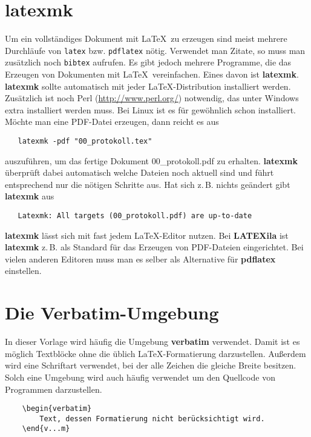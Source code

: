 \section{latexmk}

Um ein vollständiges Dokument mit \LaTeX\ zu erzeugen sind meist mehrere Durchläufe von \verb|latex| bzw. \verb|pdflatex| nötig. Verwendet man Zitate, so muss man zusätzlich noch \verb|bibtex| aufrufen. Es gibt jedoch mehrere Programme, die das Erzeugen von Dokumenten mit \LaTeX\ vereinfachen. Eines davon ist \textbf{latexmk}. \textbf{latexmk} sollte automatisch mit jeder \LaTeX-Distribution installiert werden. Zusätzlich ist noch Perl (\url{http://www.perl.org/}) notwendig, das unter Windows extra installiert werden muss. Bei Linux ist es für gewöhnlich schon installiert.\\
Möchte man eine PDF-Datei erzeugen, dann reicht es aus

\begin{verbatim}
   latexmk -pdf "00_protokoll.tex"
\end{verbatim}

auszuführen, um das fertige Dokument 00\_protokoll.pdf zu erhalten. \textbf{latexmk} überprüft dabei automatisch welche Dateien noch aktuell sind und führt entsprechend nur die nötigen Schritte aus. Hat sich z.\,B. nichts geändert gibt \textbf{latexmk} aus

\begin{verbatim}
   Latexmk: All targets (00_protokoll.pdf) are up-to-date
\end{verbatim}

\textbf{latexmk} lässt sich mit fast jedem \LaTeX-Editor nutzen. Bei \textbf{LATEXila} ist \textbf{latexmk} z.\,B. als Standard für das Erzeugen von PDF-Dateien eingerichtet. Bei vielen anderen Editoren muss man es selber als Alternative für \textbf{pdflatex} einstellen.

\section{Die Verbatim-Umgebung}

In dieser Vorlage wird häufig die Umgebung \textbf{verbatim} verwendet. Damit ist es möglich Textblöcke ohne die üblich \LaTeX-Formatierung darzustellen. Außerdem wird eine Schriftart verwendet, bei der alle Zeichen die gleiche Breite besitzen. Solch eine Umgebung wird auch häufig verwendet um den Quellcode von Programmen darzustellen.

\begin{verbatim}
    \begin{verbatim}
        Text, dessen Formatierung nicht berücksichtigt wird.
    \end{v...m}
\end{verbatim}

